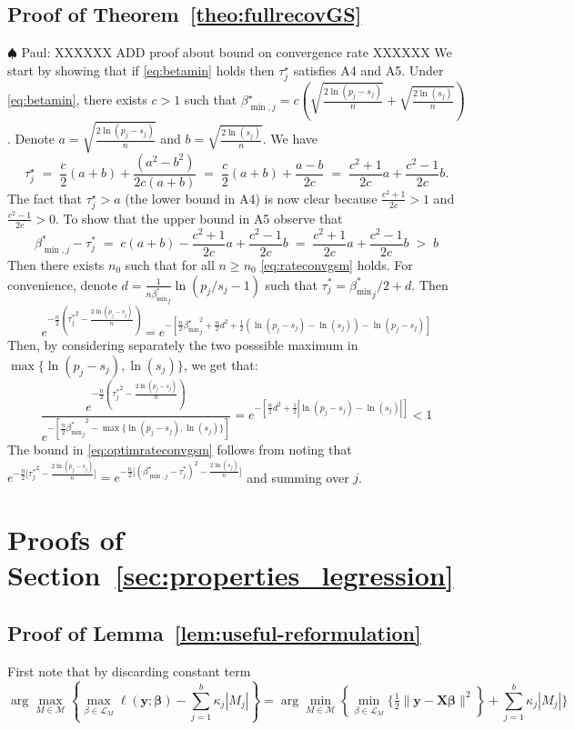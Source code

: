 \documentclass[aos]{imsart}
\theoremstyle{plain}
\newcommand{\paul}[1]{{\small{\color{green} \sf $\spadesuit$ Paul: #1}}}
\newcommand{\M}{\mathcal{M}}
\newcommand{\bs}{\boldsymbol}
\begin{document}
\subsection{Proof of Theorem~\ref{theo:fullrecovGS}}
\paul{XXXXXX ADD proof about bound on convergence rate XXXXXX}
We start by showing that if \eqref{eq:betamin} holds then $\tau^\star_j$ satisfies A4 and A5. Under \eqref{eq:betamin}, there exists $c>1$ such that $\beta^\star_{\min,j}=c(\sqrt{\tfrac{2\ln(p_j-s_j)}{n}} + \sqrt{\tfrac{2\ln(s_j)}{n}})$. Denote $a=\sqrt{\tfrac{2\ln(p_j-s_j)}{n}}$ and $b=\sqrt{\tfrac{2\ln(s_j)}{n}}$. We have
$$
\tau_j^\star\;=\;\frac{c}{2} (a+b)+\frac{(a^2-b^2)}{2c(a+b)}\;=\;\frac{c}{2} (a+b)+\frac{a-b}{2c}\;=\;\frac{c^2+1}{2c}a+\frac{c^2-1}{2c}b.
$$
The fact that $\tau^\star_j>a$ (the lower bound in A4) is now clear because $\tfrac{c^2+1}{2c}> 1$  and $\tfrac{c^2-1}{2c}> 0$. To show that the upper bound in A5 observe that
$$
\beta_{\min,j}^* - \tau^*_j \;=\; c(a+b)- \frac{c^2+1}{2c}a+\frac{c^2-1}{2c}b \;= \; \frac{c^2+1}{2c}a+\frac{c^2-1}{2c}b\;>\;  b 
$$
Then there exists $n_0$ such that for all $n\geq n_0$ \eqref{eq:rateconvgsm} holds. For convenience, denote $d = \frac{1}{n {\beta_{\min}^*}_j} \ln (p_j / s_j-1)$ such that $\tau^*_j= {\beta_{\min}^*}_j/2 + d$. Then
$$e^{-\frac{n}{2}\left({\tau^*_j}^2-\frac{2\ln(p_j-s_j)}{n}\right)}
=e^{-\left[\frac{n}{2}{\beta_{\min}^{\star}}_j^2+\frac{n}{2}d^2 + \frac{1}{2}\left(\ln (p_j- s_j)-\ln (s_j)\right) -\ln (p_j- s_j)\right]}$$
Then, by considering separately the two posssible maximum in $\max\{\ln(p_j-s_j),\ln(s_j)\}$, we get that:
$$\frac{e^{-\frac{n}{2}\left({\tau^*_j}^2-\frac{2\ln(p_j-s_j)}{n}\right)}}{e^{-[\frac{n}{2}{{\beta_{\min}^*}_j}^2-\max\{\ln(p_j-s_j),\ln(s_j)\}]}}= 
e^{-\left[\frac{n}{2}d^2 + \frac{1}{2}\left|\ln (p_j- s_j)-\ln (s_j)\right|\right]} <1$$
The bound in \eqref{eq:optimrateconvgsm} follows from noting that $e^{-\tfrac{n}{2}\big[{\tau_j^*}^2-\tfrac{2\ln(p_j-s_j)}{n}\big]}=e^{-\tfrac{n}{2}\big[(\beta^\star_{\min,j}-{\tau_j^*})^2-\tfrac{2\ln(s_j)}{n}\big]}$ and summing over $j$.


\section{Proofs of Section~\ref{sec:properties_legression}}
\subsection{Proof of Lemma~\ref{lem:useful-reformulation}}
	First note that by discarding constant term 
 $$\arg\max_{M\in \M} \left\{\max_{\beta\in \mathcal{L}_M}\ell(\bs y; \bs \beta)-\sum_{j=1}^b\kappa_j |M_j| \right\}=\arg\min_{M\in \M} \left\{\min_{\beta\in \mathcal{L}_M}\bigg\{ \tfrac{1}{2}\|\bs y-\bs X\bs\beta\|^2\right\}+\sum_{j=1}^b\kappa_j |M_j| \bigg\}$$
 
\end{document}
